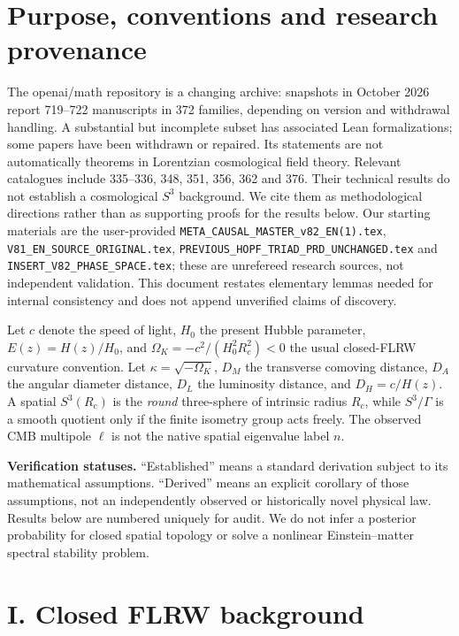 \documentclass[aps,prd,onecolumn,notitlepage,groupedaddress,11pt]{revtex4-2}
\begin{document}
\section{Purpose, conventions and research provenance}
The openai/math repository is a changing archive: snapshots in October 2026 report 719--722 manuscripts in 372 families, depending on version and withdrawal handling. A substantial but incomplete subset has associated Lean formalizations; some papers have been withdrawn or repaired. Its statements are not automatically theorems in Lorentzian cosmological field theory. Relevant catalogues include 335--336, 348, 351, 356, 362 and 376. Their technical results do not establish a cosmological $S^3$ background. We cite them as methodological directions rather than as supporting proofs for the results below. Our starting materials are the user-provided \texttt{META\_CAUSAL\_MASTER\_v82\_EN(1).tex}, \texttt{V81\_EN\_SOURCE\_ORIGINAL.tex}, \texttt{PREVIOUS\_HOPF\_TRIAD\_PRD\_UNCHANGED.tex} and \texttt{INSERT\_V82\_PHASE\_SPACE.tex}; these are unrefereed research sources, not independent validation. This document restates elementary lemmas needed for internal consistency and does not append unverified claims of discovery.

Let $c$ denote the speed of light, $H_0$ the present Hubble parameter, $E(z)=H(z)/H_0$, and $\Omega_K=-c^2/(H_0^2R_c^2)<0$ the usual closed-FLRW curvature convention. Let $\kappa=\sqrt{-\Omega_K}$, $D_M$ the transverse comoving distance, $D_A$ the angular diameter distance, $D_L$ the luminosity distance, and $D_H=c/H(z)$. A spatial $S^3(R_c)$ is the \emph{round} three-sphere of intrinsic radius $R_c$, while $S^3/\Gamma$ is a smooth quotient only if the finite isometry group acts freely. The observed CMB multipole $\ell$ is not the native spatial eigenvalue label $n$.

\noindent\textbf{Verification statuses.} ``Established'' means a standard derivation subject to its mathematical assumptions. ``Derived'' means an explicit corollary of those assumptions, not an independently observed or historically novel physical law. Results below are numbered uniquely for audit. We do not infer a posterior probability for closed spatial topology or solve a nonlinear Einstein--matter spectral stability problem.

\section{I. Closed FLRW background}
\end{document}
